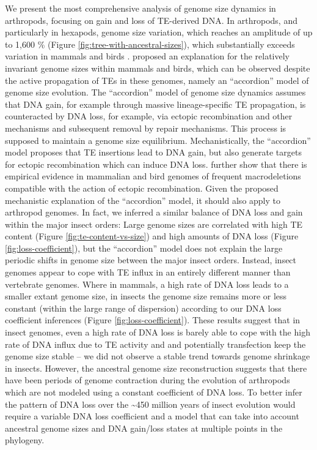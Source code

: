 We present the most comprehensive analysis of genome size dynamics in
arthropods, focusing on gain and loss of TE-derived DNA. In arthropods,
and particularly in hexapods, genome size variation, which reaches an
amplitude of up to 1,600 \% (Figure \ref{fig:tree-with-ancestral-sizes}), which substantially exceeds
variation in mammals and birds \citep{Kapusta2017a}. \citet{Kapusta2017a}
proposed an explanation for the relatively invariant genome sizes within
mammals and birds, which can be observed despite the active propagation
of TEs in these genomes, namely an ``accordion'' model of genome size
evolution. The ``accordion'' model of genome size dynamics assumes that
DNA gain, for example through massive lineage-specific TE propagation,
is counteracted by DNA loss, for example, via ectopic recombination and
other mechanisms and subsequent removal by repair mechanisms. This
process is supposed to maintain a genome size equilibrium.
Mechanistically, the ``accordion'' model proposes that TE insertions
lead to DNA gain, but also generate targets for ectopic recombination
which can induce DNA loss. \citet{Kapusta2017a} further show that there is
empirical evidence in mammalian and bird genomes of frequent
macrodeletions compatible with the action of ectopic recombination.
Given the proposed mechanistic explanation of the ``accordion'' model,
it should also apply to arthropod genomes. In fact, we inferred a
similar balance of DNA loss and gain within the major insect orders:
Large genome sizes are correlated with high TE content (Figure
\ref{fig:te-content-vs-size}) and
high amounts of DNA loss (Figure \ref{fig:loss-coefficient}), but the ``accordion'' model does
not explain the large periodic shifts in genome size between the major
insect orders. Instead, insect genomes appear to cope with TE influx in
an entirely different manner than vertebrate genomes. Where in mammals,
a high rate of DNA loss leads to a smaller extant genome size, in
insects the genome size remains more or less constant (within the large
range of dispersion) according to our DNA loss coefficient inferences
(Figure \ref{fig:loss-coefficient}). These results suggest that in insect genomes, even a high
rate of DNA loss is barely able to cope with the high rate of DNA influx
due to TE activity and and potentially transfection keep the genome size
stable -- we did not observe a stable trend towards genome shrinkage in
insects. However, the ancestral genome size reconstruction suggests that
there have been periods of genome contraction during the evolution of
arthropods which are not modeled using a constant coefficient of DNA
loss. To better infer the pattern of DNA loss over the
\textasciitilde{}450 million years of insect evolution would require a
variable DNA loss coefficient and a model that can take into account
ancestral genome sizes and DNA gain/loss states at multiple points in
the phylogeny.

